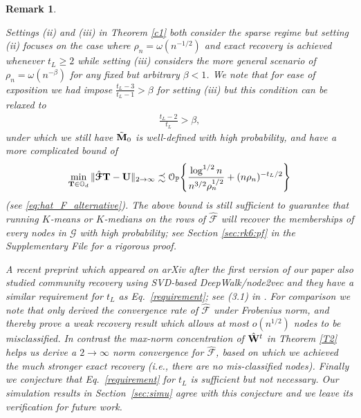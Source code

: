 \documentclass[10pt,journal,compsoc]{IEEEtran}
\newcommand{\op}{\mathcal{O}_{\mathbb{P}}}
\newcommand{\ee}{\end{aligned} \end{equation}}
\newcommand{\bds}{\boldsymbol}
\newtheorem{remark}{Remark}
\newcommand{\twoinf}{2\rightarrow \infty}
\newcommand{\bee}{\begin{equation}\begin{aligned}}
\newcommand{\M}[1]{{{\mathbf{\MakeUppercase{#1}}}}}
\numberwithin{equation}{section}
\begin{document}
\begin{remark}\label{rk:improved}
{\upshape \color{black} Settings (ii) and (iii) in Theorem \ref{c1} both consider the sparse regime but setting (ii) focuses on the case where $\rho_n  = \omega(n^{-1/2})$ and exact recovery is achieved whenever $t_L \geq 2$ while setting (iii) considers the more general scenario of $\rho_n = \omega(n^{-\beta})$ for any fixed but arbitrary $\beta < 1$. We note that for ease of exposition we had impose $\tfrac{t_L - 3}{t_L - 1} > \beta$ for setting (iii) but this condition can be relaxed to 
\bee\label{requirement}
\frac{t_L - 2}{t_L} > \beta,
\ee
under which we still have $\tilde{\M M}_0$ is well-defined with high probability, and have a more complicated bound of
$$\min_{\M T \in \mathbb{O}_{d}} \|\hat{\bds{\mathcal{F}}} \mathbf{T} - \mathbf{U}\|_{\twoinf} \precsim \op\Bigg\{\frac{\log^{1/2}{n}}{ n^{3/2}\rho_n^{1/2}} + (n\rho_n)^{-t_L/2}\Bigg\}$$
(see \eqref{eq:hat_F_alternative}). The above bound is still sufficient to guarantee that running $K$-means or $K$-medians on the rows of $\hat{\bds{\mathcal{F}}}$ will recover the memberships of every nodes in $\mathcal{G}$ with high probability; see Section \ref{sec:rk6:pf} in the Supplementary File for a rigorous proof.
\par A recent preprint \cite{barot2021community} which appeared on arXiv after the first version of our paper also studied community recovery using SVD-based DeepWalk/node2vec and they have a similar requirement for $t_L$ as Eq.~\eqref{requirement}; see (3.1) in \cite{barot2021community}. For comparison we note that \cite{barot2021community} only derived the convergence rate of $\hat{\bds{\mathcal{F}}}$ under Frobenius norm, and thereby prove a {\em weak} recovery result which allows at most $o(n^{1/2})$ nodes to be misclassified. In contrast the max-norm concentration of $\hat{\M W}^t$ in Theorem \ref{T2} helps us derive a $2\to\infty$ norm convergence for $\hat{\bds{\mathcal{F}}}$, based on which we achieved the much stronger exact recovery (i.e., there are no mis-classified nodes). Finally we conjecture that Eq.~\eqref{requirement} for $t_L$ is sufficient but not necessary. Our simulation results in Section~\ref{sec:simu} agree with this conjecture and we leave its verification for future work.} 
\end{remark}
\end{document}
